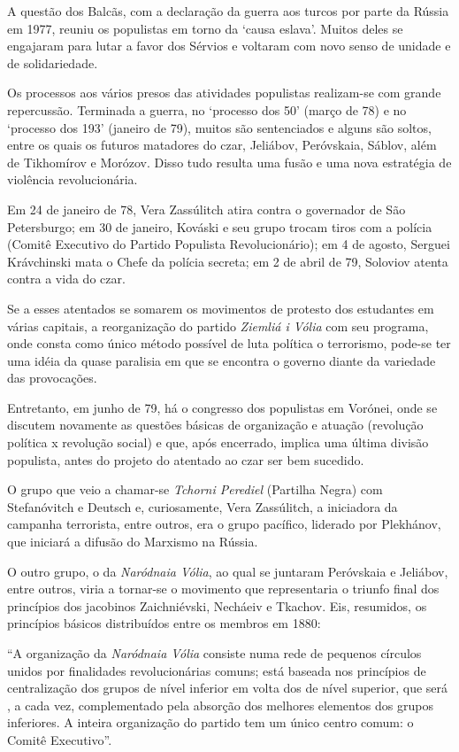 A questão dos Balcãs, com a declaração da guerra aos turcos por parte da
Rússia em 1977, reuniu os populistas em torno da `causa eslava'. Muitos
deles se engajaram para lutar a favor dos Sérvios e voltaram com novo
senso de unidade e de solidariedade.

Os processos aos vários presos das atividades populistas realizam-se com
grande repercussão. Terminada a guerra, no `processo dos 50' (março de
78) e no `processo dos 193' (janeiro de 79), muitos são sentenciados e
alguns são soltos, entre os quais os futuros matadores do czar,
Jeliábov, Peróvskaia, Sáblov, além de Tikhomírov e Morózov. Disso tudo
resulta uma fusão e uma nova estratégia de violência revolucionária.

Em 24 de janeiro de 78, Vera Zassúlitch atira contra o governador de São
Petersburgo; em 30 de janeiro, Kováski e seu grupo trocam tiros com a
polícia (Comitê Executivo do Partido Populista Revolucionário); em 4 de
agosto, Serguei Krávchinski mata o Chefe da polícia secreta; em 2 de
abril de 79, Soloviov atenta contra a vida do czar.

Se a esses atentados se somarem os movimentos de protesto dos estudantes
em várias capitais, a reorganização do partido \emph{Ziemliá i Vólia}
com seu programa, onde consta como único método possível de luta
política o terrorismo, pode-se ter uma idéia da quase paralisia em que
se encontra o governo diante da variedade das provocações.

Entretanto, em junho de 79, há o congresso dos populistas em Vorónei,
onde se discutem novamente as questões básicas de organização e atuação
(revolução política x revolução social) e que, após encerrado, implica
uma última divisão populista, antes do projeto do atentado ao czar ser
bem sucedido.

O grupo que veio a chamar-se \emph{Tchorni Perediel} (Partilha Negra)
com Stefanóvitch e Deutsch e, curiosamente, Vera Zassúlitch, a
iniciadora da campanha terrorista, entre outros, era o grupo pacífico,
liderado por Plekhánov, que iniciará a difusão do Marxismo na Rússia.

O outro grupo, o da \emph{Naródnaia Vólia}, ao qual se juntaram
Peróvskaia e Jeliábov, entre outros, viria a tornar-se o movimento que
representaria o triunfo final dos princípios dos jacobinos Zaichniévski,
Necháeiv e Tkachov. Eis, resumidos, os princípios básicos distribuídos
entre os membros em 1880:

``A organização da \emph{Naródnaia Vólia} consiste numa rede de pequenos
círculos unidos por finalidades revolucionárias comuns; está baseada nos
princípios de centralização dos grupos de nível inferior em volta dos de
nível superior, que será , a cada vez, complementado pela absorção dos
melhores elementos dos grupos inferiores. A inteira organização do
partido tem um único centro comum: o Comitê Executivo''.

